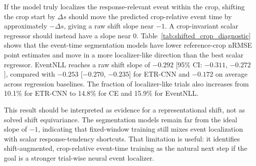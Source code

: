 \documentclass[12pt]{article}
\begin{document}
If the model truly localizes the response-relevant event within the crop, shifting the crop start by $\Delta s$ should move the predicted crop-relative event time by approximately $-\Delta s$, giving a raw shift slope near $-1$. A crop-invariant scalar regressor should instead have a slope near 0. Table~\ref{tab:shifted_crop_diagnostic} shows that the event-time segmentation models have lower reference-crop nRMSE point estimates and move in a more localizer-like direction than the best scalar regressor. EventNLL reaches a raw shift slope of $-0.292$ [95\% CI: $-0.311$, $-0.272$], compared with $-0.253$ [$-0.270$, $-0.235$] for ETR-CNN and $-0.172$ on average across regression baselines. The fraction of localizer-like trials also increases from 10.1\% for ETR-CNN to 14.8\% for CE and 15.9\% for EventNLL.

This result should be interpreted as evidence for a representational shift, not as solved shift equivariance. The segmentation models remain far from the ideal slope of $-1$, indicating that fixed-window training still mixes event localization with scalar response-tendency shortcuts. That limitation is useful: it identifies shift-augmented, crop-relative event-time training as the natural next step if the goal is a stronger trial-wise neural event localizer.

\begin{table}[!t]
\centering
\caption{Shifted-crop diagnostic on the R11 common-inside subset. The ideal within-crop event localizer has raw shift slope $-1$; a crop-invariant scalar shortcut has slope 0. Reference nRMSE is computed at the standard $s=0.5$~s crop. Localizer-like trials have per-trial raw slope in $[-1.25,-0.75]$; invariant-like trials have per-trial raw slope in $[-0.25,0.25]$.}
\label{tab:shifted_crop_diagnostic}
\scriptsize
\setlength{\tabcolsep}{3pt}
\renewcommand{\arraystretch}{1.12}
\end{table}
\end{document}
